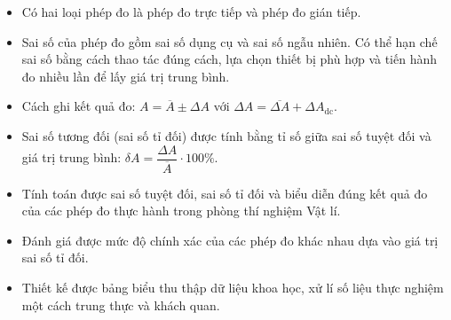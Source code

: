 \begin{emdahoc}
\begin{itemize}
\item Có hai loại phép đo là phép đo trực tiếp và phép đo gián tiếp.
\item Sai số của phép đo gồm sai số dụng cụ và sai số ngẫu nhiên. Có thể hạn chế sai số bằng cách thao tác đúng cách, lựa chọn thiết bị phù hợp và tiến hành đo nhiều lần để lấy giá trị trung bình.
\item Cách ghi kết quả đo: $A = \overline{A} \pm \Delta A$ với $\Delta A = \overline{\Delta A} + \Delta A_{\text{dc}}$.
\item Sai số tương đối (sai số tỉ đối) được tính bằng tỉ số giữa sai số tuyệt đối và giá trị trung bình: $\delta A = \dfrac{\Delta A}{\overline{A}} \cdot 100\%$.
\end{itemize}
\end{emdahoc}
\begin{emcothe}
\begin{itemize}
\item Tính toán được sai số tuyệt đối, sai số tỉ đối và biểu diễn đúng kết quả đo của các phép đo thực hành trong phòng thí nghiệm Vật lí.
\item Đánh giá được mức độ chính xác của các phép đo khác nhau dựa vào giá trị sai số tỉ đối.
\item Thiết kế được bảng biểu thu thập dữ liệu khoa học, xử lí số liệu thực nghiệm một cách trung thực và khách quan.
\end{itemize}
\end{emcothe}